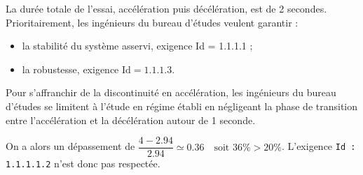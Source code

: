 La durée totale de l'essai, accélération puis décélération, est de 2 secondes.\\
Prioritairement, les ingénieurs du bureau d'études veulent garantir :

\begin{itemize}
  \item la stabilité du système asservi, exigence Id = 1.1.1.1 ;
  \item la robustesse, exigence $\mathrm{Id}=1.1 .1 .3$.
\end{itemize}

Pour s'affranchir de la discontinuité en accélération, les ingénieurs du bureau d'études se limitent à l'étude en régime établi en négligeant la phase de transition entre l'accélération et la décélération autour de 1 seconde.
\fi

\ifprof
\begin{corrige}

On a alors un dépassement de $\dfrac{4 - 2.94}{2.94} \simeq 0.36 \quad \text{soit 36\%} > 20\%$. L'exigence \texttt{Id : 1.1.1.1.2} n'est donc pas respectée.
\end{corrige}
\else
\fi

